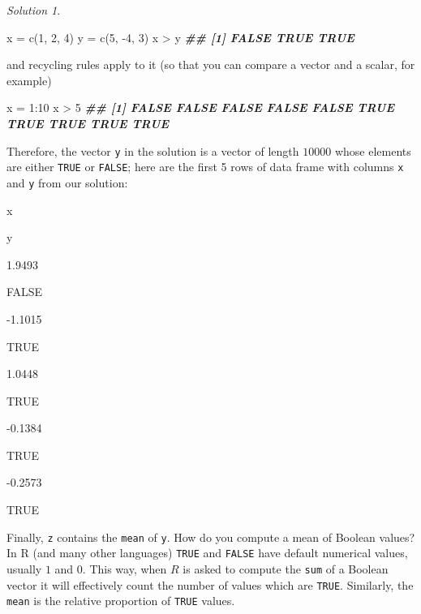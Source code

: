 \documentclass[
]{book}
\newenvironment{Shaded}{\begin{snugshade}}{\end{snugshade}}
\newcommand{\DecValTok}[1]{\textcolor[rgb]{0.00,0.00,0.81}{#1}}
\newcommand{\DocumentationTok}[1]{\textcolor[rgb]{0.56,0.35,0.01}{\textbf{\textit{#1}}}}
\newcommand{\FunctionTok}[1]{\textcolor[rgb]{0.00,0.00,0.00}{#1}}
\newcommand{\NormalTok}[1]{#1}
\newcommand{\OtherTok}[1]{\textcolor[rgb]{0.56,0.35,0.01}{#1}}
\newcommand{\SpecialCharTok}[1]{\textcolor[rgb]{0.00,0.00,0.00}{#1}}
\theoremstyle{definition}
\theoremstyle{definition}
\theoremstyle{definition}
\theoremstyle{definition}
\theoremstyle{remark}
\newtheorem*{solution}{Solution}
\begin{document}
\begin{solution}
\begin{Shaded}
\begin{Highlighting}[]
\NormalTok{x }\OtherTok{=} \FunctionTok{c}\NormalTok{(}\DecValTok{1}\NormalTok{, }\DecValTok{2}\NormalTok{, }\DecValTok{4}\NormalTok{)}
\NormalTok{y }\OtherTok{=} \FunctionTok{c}\NormalTok{(}\DecValTok{5}\NormalTok{, }\SpecialCharTok{{-}}\DecValTok{4}\NormalTok{, }\DecValTok{3}\NormalTok{)}
\NormalTok{x }\SpecialCharTok{\textgreater{}}\NormalTok{ y}
\DocumentationTok{\#\# [1] FALSE  TRUE  TRUE}
\end{Highlighting}
\end{Shaded}

and recycling rules apply to it (so that you can compare a vector and a scalar, for example)

\begin{Shaded}
\begin{Highlighting}[]
\NormalTok{x }\OtherTok{=} \DecValTok{1}\SpecialCharTok{:}\DecValTok{10}
\NormalTok{x }\SpecialCharTok{\textgreater{}} \DecValTok{5}
\DocumentationTok{\#\#  [1] FALSE FALSE FALSE FALSE FALSE  TRUE  TRUE  TRUE  TRUE  TRUE}
\end{Highlighting}
\end{Shaded}

Therefore, the vector \texttt{y} in the solution is a vector of length \(10000\) whose
elements are either \texttt{TRUE} or \texttt{FALSE}; here are the first 5 rows of data frame
with columns \texttt{x} and \texttt{y} from our solution:

x

y

1.9493

FALSE

-1.1015

TRUE

1.0448

TRUE

-0.1384

TRUE

-0.2573

TRUE

Finally, \texttt{z} contains the \texttt{mean} of \texttt{y}. How do you compute a mean of Boolean values? In R (and many other languages) \texttt{TRUE} and \texttt{FALSE} have default numerical values, usually \(1\) and \(0\). This way, when \(R\) is asked to compute the \texttt{sum} of a Boolean vector it will effectively count the number of values which are \texttt{TRUE}. Similarly, the \texttt{mean} is the relative proportion of \texttt{TRUE} values.


\end{solution}
\end{document}
